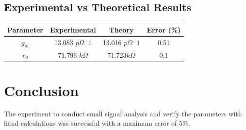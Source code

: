 \documentclass{article}
\begin{document}
\subsection*{Experimental vs Theoretical Results}
\begin{center}
\begin{tabular}{|c|c|c|c|}
\hline
Parameter & Experimental & Theory & Error (\%) \\
\hline
$g_m$    & 13.083  $p\Omega^-1$ & 13.016 $p\Omega^-1$ & 0.51 \\
$r_0$ & 71.796 $k\Omega$ &  $71.723 k\Omega$  & 0.1 \\
\hline
\end{tabular}
\end{center}
\section{Conclusion}
The experiment to conduct small signal analysis and verify the parameters with hand calculations was successful with a maximum error of $5 \%$.
\end{document}
